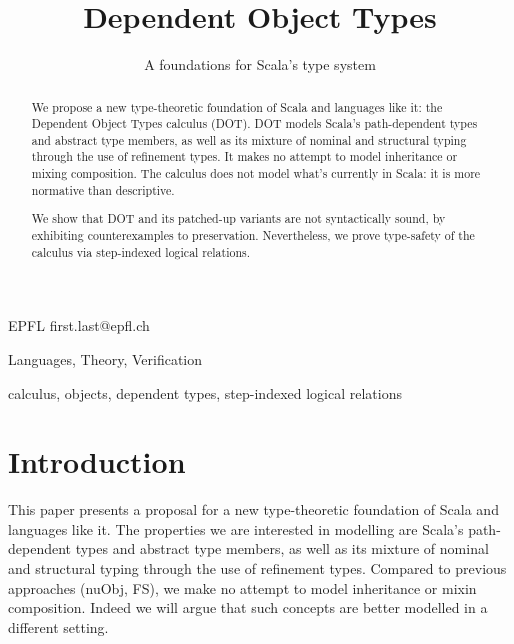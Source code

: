 \documentclass[9pt]{sigplanconf}
\begin{document}
\copyrightdata{[to be supplied]} 

\title{Dependent Object Types}
\subtitle{A foundations for Scala's type system} %

           {EPFL}
           {first.last@epfl.ch}

\maketitle

\begin{abstract}
We propose a new type-theoretic foundation of Scala and languages like
it: the Dependent Object Types calculus (DOT). DOT models Scala's
path-dependent types and abstract type members, as well as its mixture
of nominal and structural typing through the use of reﬁnement
types. It makes no attempt to model inheritance or mixing
composition. The calculus does not model what's currently in Scala: it
is more normative than descriptive.

We show that DOT and its patched-up variants are not syntactically
sound, by exhibiting counterexamples to preservation. Nevertheless, we
prove type-safety of the calculus via step-indexed logical relations.
\end{abstract}


\terms
Languages, Theory, Verification

\keywords
calculus, objects, dependent types, step-indexed logical relations

\section{Introduction}

This paper presents a proposal for a new type-theoretic foundation of
Scala and languages like it. The properties we are interested in
modelling are Scala's path-dependent types and abstract type members,
as well as its mixture of nominal and structural typing through the
use of refinement types. Compared to previous approaches (nuObj, FS),
we make no attempt to model inheritance or mixin composition. Indeed
we will argue that such concepts are better modelled in a different
setting.
\end{document}
